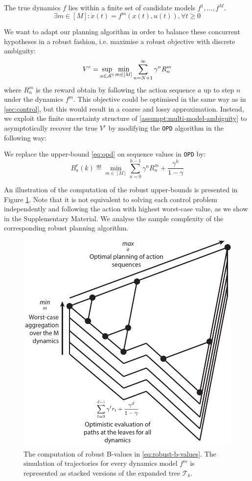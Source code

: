 \documentclass{article}
\begin{document}
\begin{assumption}
\label{assumpt:multi-model-ambiguity}
The true dynamics $f$ lies within a finite set of candidate models $f^1, \dots, f^M$.
\begin{equation*}
\exists m\in[M]: \dot{x}(t) = f^m(x(t), u(t)), \forall t\geq 0
\end{equation*}
\end{assumption}
We want to adapt our planning algorithm in order to balance these concurrent hypotheses in a robust fashion, i.e. maximise a robust objective with discrete ambiguity:
\begin{equation}
\label{eq:robust-objective-discrete}
V^r = \sup_{a\in\mathcal{A}^{\mathbb{N}}}\min_{m\in[M]} \sum_{n=N+1}^\infty \gamma^n R_n^m
\end{equation}
where $R_n^m$ is the reward obtain by following the action sequence $a$ up to step $n$ under the dynamics $f^m$.
This objective could be optimised in the same way as in \autoref{sec:control}, but this would result in a coarse and lossy approximation. Instead, we exploit the finite uncertainty structure of \autoref{assumpt:multi-model-ambiguity} to asymptotically recover the true $V^r$ by modifying the \texttt{OPD} algorithm in the following way:

\begin{definition} We replace the upper-bound \eqref{eq:opd} on sequence values in \texttt{OPD} by:
\begin{equation}
\label{eq:robust-b-values}
B_a^r(k)  \eqdef \min_{m\in[M]} \sum_{n=0}^{h-1} \gamma^n R_n^m  + \frac{\gamma^h}{1-\gamma}
\end{equation}
\end{definition}
An illustration of the computation of the robust upper-bounds is presented in Figure \ref{fig:drop}. Note that it is not equivalent to solving each control problem independently and following the action with highest worst-case value, as we show in the Supplementary Material. We analyse the sample complexity of the corresponding robust planning algorithm.

\begin{figure}
\centering
\includegraphics[width=0.45\linewidth]{img/robust-control-tree}
\caption{The computation of robust B-values in \eqref{eq:robust-b-values}. The simulation of trajectories for every dynamics model $f^m$ is represented as stacked versions of the expanded tree $\mathcal{T}_k$.}
\label{fig:drop}
\end{figure}
\end{document}
